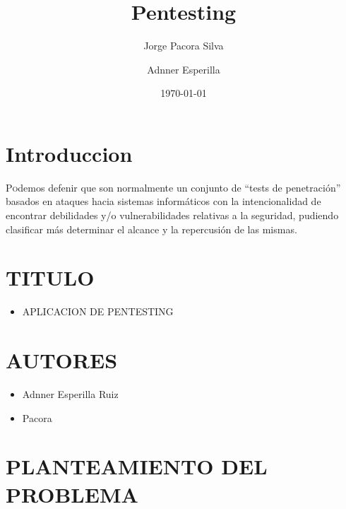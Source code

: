 \documentclass[twoside,twocolumn]{article}
\title{ Pentesting} %
\author{
    Jorge Pacora Silva
    \and
    Adnner Esperilla
}
\date{\today} %
\begin{document}
\maketitle


\section{Introduccion}

\lettrine[nindent=0em,lines=3]{P}odemos defenir que son normalmente un conjunto de “tests de penetración” basados en ataques hacia sistemas informáticos con la intencionalidad de encontrar debilidades y/o vulnerabilidades relativas a la seguridad, pudiendo clasificar más determinar el alcance y la repercusión de las mismas.

\section{TITULO}
\begin{itemize}
\item APLICACION DE PENTESTING
\end{itemize}
\section{AUTORES}
\begin{itemize}
\item Adnner Esperilla Ruiz
\item Pacora
\end{itemize}
\section{PLANTEAMIENTO DEL PROBLEMA}
\end{document}
